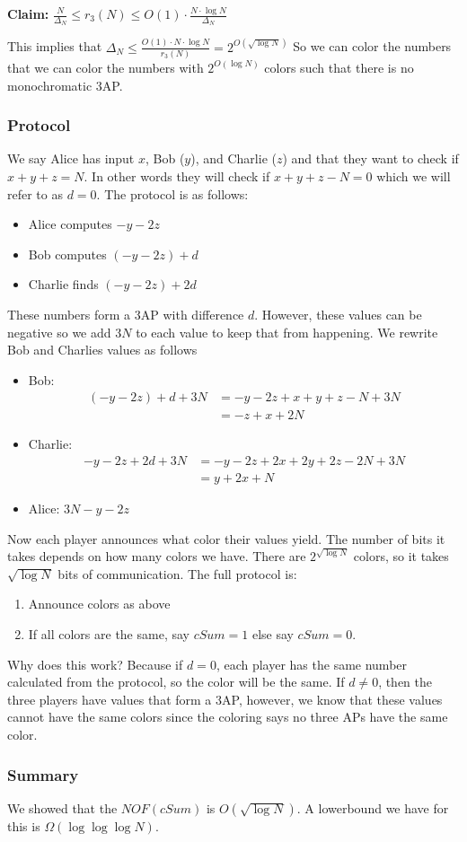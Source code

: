 \documentclass[11pt]{article}
\theoremstyle{definition}
\begin{document}
\textbf{Claim:} $\frac{N}{\Delta_N} \leq r_3(N) \leq O(1) \cdot \frac{N \cdot \log N}{\Delta_N}$
\bigskip

This implies that $\Delta_N \leq \frac{O(1) \cdot N \cdot \log N}{r_3(N)} = 2^{O(\sqrt{\log N})}$ So we can color the numbers that we can color the numbers with $2^{O(\log N)}$ colors such that there is no monochromatic 3AP.
\subsubsection{Protocol}
We say Alice has input $x$, Bob ($y$), and Charlie ($z$) and that they want to check if $x+y+z = N$. In other words they will check if $x+y+z-N = 0$ which we will refer to as $d=0$. The protocol is as follows:
\begin{itemize}
    \item Alice computes $-y-2z$
    \item Bob computes $(-y-2z)+d$
    \item Charlie finds $(-y-2z)+2d$
\end{itemize}
These numbers form a 3AP with difference $d$. However, these values can be negative so we add $3N$ to each value to keep that from happening. We rewrite Bob and Charlies values as follows
\begin{itemize}
    \item Bob:
    \begin{align*}
    (-y-2z) + d + 3N&= -y-2z + x + y + z - N + 3N\\
    &= -z + x + 2N
    \end{align*}
    \item Charlie:
    \begin{align*}
    -y-2z+2d + 3N &= -y -2z + 2x + 2y + 2z - 2N + 3N\\
    &= y + 2x + N
    \end{align*}
    \item Alice: $3N -y -2z$
\end{itemize}
Now each player announces what color their values yield. The number of bits it takes depends on how many colors we have. There are $2^{\sqrt{\log N}}$ colors, so it takes $\sqrt{\log N}$ bits of communication. The full protocol is:
\begin{enumerate}
    \item Announce colors as above
    \item If all colors are the same, say $cSum = 1$ else say $cSum=0$.
\end{enumerate}
Why does this work? Because if $d=0$, each player has the same number calculated from the protocol, so the color will be the same. If $d \neq 0$, then the three players have values that form a $3$AP, however, we know that these values cannot have the same colors since the coloring says no three APs have the same color. 
\subsubsection{Summary}
We showed that the $NOF(cSum)$ is $O(\sqrt{\log N})$. A lowerbound we have for this is $\Omega (\log \log \log N)$.
\end{document}
